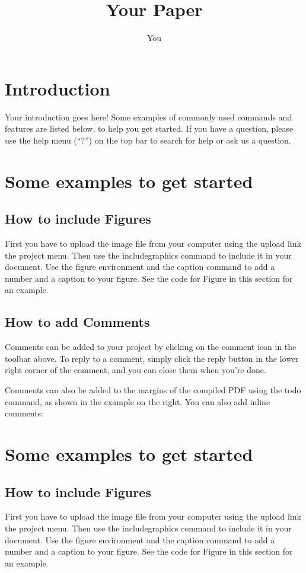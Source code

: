 \documentclass[a4paper]{article}
\title{Your Paper}
\author{You}
\begin{document}
\section{Introduction}

Your introduction goes here! Some examples of commonly used commands and features are listed below, to help you get started. If you have a question, please use the help menu (``?'') on the top bar to search for help or ask us a question. 

\section{Some examples to get started}

\subsection{How to include Figures}

First you have to upload the image file from your computer using the upload link the project menu. Then use the includegraphics command to include it in your document. Use the figure environment and the caption command to add a number and a caption to your figure. See the code for Figure in this section for an example.

\subsection{How to add Comments}

Comments can be added to your project by clicking on the comment icon in the toolbar above. 
To reply to a comment, simply click the reply button in the lower right corner of the comment, and you can close them when you're done.

Comments can also be added to the margins of the compiled PDF using the todo command, as shown in the example on the right. You can also add inline comments:

\section{Some examples to get started}

\subsection{How to include Figures}

First you have to upload the image file from your computer using the upload link the project menu. Then use the includegraphics command to include it in your document. Use the figure environment and the caption command to add a number and a caption to your figure. See the code for Figure in this section for an example.
\end{document}
